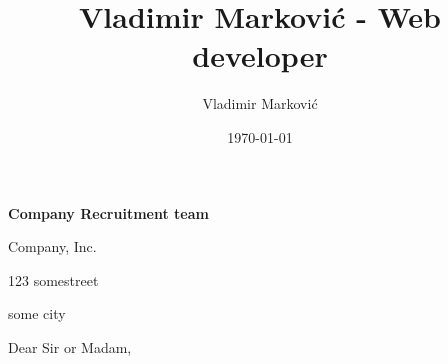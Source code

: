 \documentclass{article}
\title{Vladimir Marković - Web developer}
\author{Vladimir Marković}
\date{\today}
\begin{document}
\sffamily


\vspace{0mm}
\setlength{\parindent}{1mm}
\large
\textbf{Company Recruitment team}

\vspace{0mm}
\setlength{\parindent}{1mm}
Company, Inc.

\vspace{0mm}
\setlength{\parindent}{1mm}
123 somestreet

\vspace{0mm}
\setlength{\parindent}{1mm}
some city

\vspace{5mm}
\setlength{\parindent}{1mm}
\usdate{\today}

\vspace{5mm}
\setlength{\parindent}{1mm}
Dear Sir or Madam,

\vspace{5mm}
\end{document}
